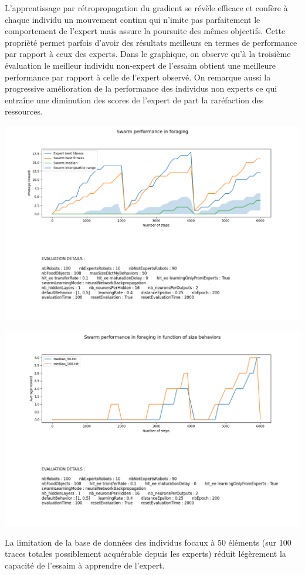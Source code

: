 \documentclass[a4paper, 12pt]{report}
\begin{document}
    L'apprentissage par rétropropagation du gradient se révèle efficace et confère à chaque individu un mouvement continu qui n'imite pas parfaitement le comportement de l'expert mais assure la poursuite des mêmes objectifs. Cette proprièté permet parfois d'avoir des résultats meilleurs en termes de performance par rapport à ceux des experts. 
    Dans le graphique, on observe qu'à la troisième évaluation le meilleur individu non-expert de l'essaim obtient une meilleure performance par rapport à celle de l'expert observé. On remarque aussi la progressive amélioration de la performance des individus non experts ce qui entraîne une diminution des scores de l'expert de part la raréfaction des ressources.


    \includegraphics[scale=0.5]{bp6000_50.png}

    \includegraphics[scale=0.5]{sizeDB_50vs100_bp.png}

    La limitation de la base de données des individus focaux à 50 éléments (sur 100 traces totales possiblement acquérable depuis les experts) réduit légèrement la capacité de l'essaim à apprendre de l'expert. 
\end{document}
